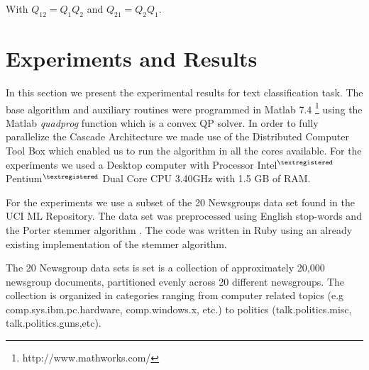 With $Q_{12}=Q_{1}Q_{2}$ and $Q_{21}=Q_{2}Q_{1}$. 


\section{Experiments and Results}

In this section we present the experimental results for text classification
task. The base algorithm and auxiliary routines were programmed in
Matlab 7.4%
\footnote{http://www.mathworks.com/%
} using the Matlab \emph{quadprog} function which is a convex QP solver.
In order to fully parallelize the Cascade Architecture we made use
of the Distributed Computer Tool Box which enabled us to run the algorithm
in all the cores available. For the experiments we used a Desktop
computer with Processor Intel$^{\textregistered}$ Pentium$^{\textregistered}$
Dual Core CPU 3.40GHz with 1.5 GB of RAM.

For the experiments we use a subset of the 20 Newsgroups \cite{20news}
data set found in the UCI ML Repository\cite{Asuncion+Newman:2007}.
The data set was preprocessed using English stop-words and the Porter
stemmer algorithm \cite{Porter80}. The code was written
in Ruby using an already existing implementation of the stemmer algorithm. 

The 20 Newsgroup data sets is set is a collection of approximately
20,000 newsgroup documents, partitioned evenly across 20 different
newsgroups. The collection is organized in categories ranging from computer
related topics (e.g comp.sys.ibm.pc.hardware, comp.windows.x, etc.) to
politics (talk.politics.misc,  talk.politics.guns,etc).

